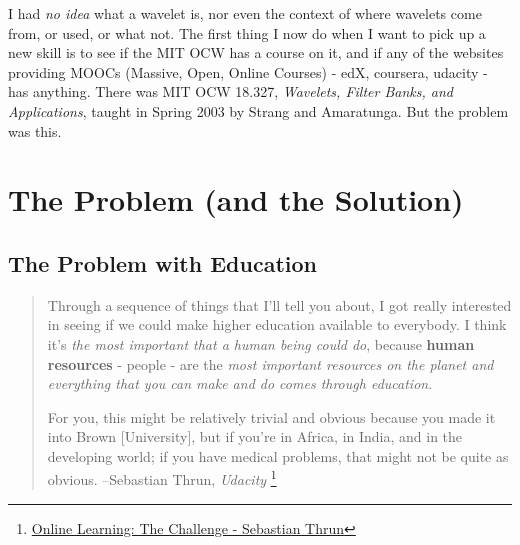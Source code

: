 \documentclass[twoside]{amsart}
\theoremstyle{plain}
\theoremstyle{definition}
\theoremstyle{remark}
\numberwithin{equation}{section}
\begin{document}
I had \emph{no idea} what a wavelet is, nor even the context of where wavelets come from, or used, or what not.  The first thing I now do when I want to pick up a new skill is to see if the MIT OCW  has a course on it, and if any of the websites providing MOOCs (Massive, Open, Online Courses) - edX, coursera, udacity - has anything.  There was MIT OCW 18.327, \emph{Wavelets, Filter Banks, and Applications}, taught in Spring 2003 by Strang and Amaratunga.  But the problem was this.

\section{The Problem (and the Solution)}

\subsection{The Problem with Education}

\begin{quotation}
Through a sequence of things that I'll tell you about, I got really interested in seeing if we could make higher education available to everybody. I think it's \emph{the most important that a human being could do}, because \textbf{human resources} - people - are the \emph{most important resources on the planet and everything that you can make and do comes through education}. 

For you, this might be relatively trivial and obvious because you made it into Brown [University], but if you’re in Africa, in India, and in the developing world; if you have medical problems, that might not be quite as obvious. --Sebastian Thrun, \emph{Udacity} \footnote{\href{http://youtu.be/YqH25oEKd24}{Online Learning: The Challenge - Sebastian Thrun}}
\end{quotation}
\end{document}
